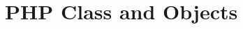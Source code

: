 \part{PHP Class and Objects}































































































































































\clearpage